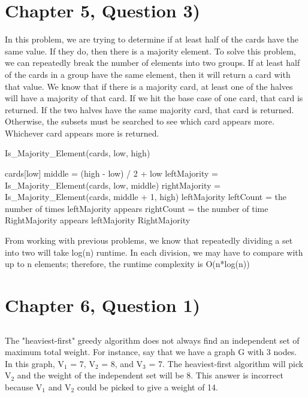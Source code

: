 \documentclass[11pt]{article}
\begin{document}
\section{Chapter 5, Question 3)}
In this problem, we are trying to determine if at least half of the cards have the same value. If they do, then there is a majority element. To solve this problem, we can repeatedly break the number of elements into two groups. If at least half of the cards in a group have the same element, then it will return a card with that value. We know that if there is a majority card, at least one of the halves will have a majority of that card. 
\newline 
If we hit the base case of one card, that card is returned. If the two halves have the same majority card, that card is returned. Otherwise, the subsets must be searched to see which card appears more. Whichever card appears more is returned.
\begin{algorithm}[H]
\caption{Is\_Majority\_Element(cards, low, high)}
\begin{algorithmic} 
\RETURN cards[low]
\ENDIF
\STATE middle = (high - low) / 2 + low
\STATE leftMajority = Is\_Majority\_Element(cards, low, middle)
\STATE rightMajority = Is\_Majority\_Element(cards, middle + 1, high)
\RETURN leftMajority
\ENDIF
\STATE leftCount = the number of times leftMajority appears
\STATE rightCount = the number of time RightMajority appears
\RETURN leftMajority
\ELSE
\RETURN RightMajority
\ENDIF
\end{algorithmic}
\end{algorithm}

From working with previous problems, we know that repeatedly dividing a set into two will take log(n) runtime. In each division, we may have to compare with up to n elements; therefore, the runtime complexity is O(n*log(n))

\section{Chapter 6, Question 1)}
\subsection{}
The "heaviest-first" greedy algorithm does not always find an independent set of maximum total weight. For instance, say that we have a graph G with 3 nodes. In this graph, V$_1$ = 7, V$_2$ = 8, and V$_3$ = 7. The heaviest-first algorithm will pick V$_2$ and the weight of the independent set will be 8. This answer is incorrect because V$_1$ and V$_2$ could be picked to give a weight of 14.
\end{document}
